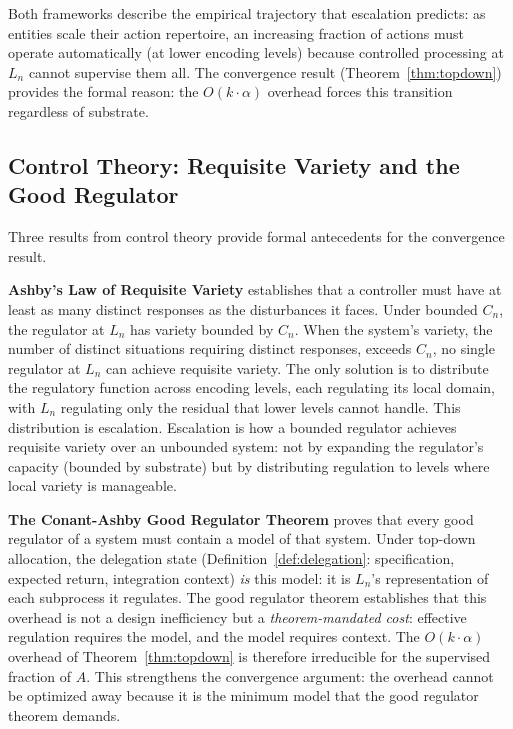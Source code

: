 \documentclass[11pt]{article}
\theoremstyle{definition}
\begin{document}
Both frameworks describe the empirical trajectory that escalation
predicts: as entities scale their action repertoire, an increasing
fraction of actions must operate automatically (at lower encoding
levels) because controlled processing at $L_n$ cannot supervise
them all. The convergence result (Theorem~\ref{thm:topdown}) provides
the formal reason: the $O(k \cdot \alpha)$ overhead forces this
transition regardless of substrate.

\subsection{Control Theory: Requisite Variety and the Good Regulator}

Three results from control theory provide formal antecedents for the
convergence result.

\textbf{Ashby's Law of Requisite Variety} \cite{Ashby1956} establishes
that a controller must have at least as many distinct responses as the
disturbances it faces. Under bounded $C_n$, the regulator at $L_n$ has
variety bounded by $C_n$. When the system's variety, the number of
distinct situations requiring distinct responses, exceeds $C_n$, no
single regulator at $L_n$ can achieve requisite variety. The only
solution is to distribute the regulatory function across encoding
levels, each regulating its local domain, with $L_n$ regulating only
the residual that lower levels cannot handle. This distribution is
escalation. Escalation is how a bounded regulator achieves requisite
variety over an unbounded system: not by expanding the regulator's
capacity (bounded by substrate) but by distributing regulation to
levels where local variety is manageable.

\textbf{The Conant-Ashby Good Regulator Theorem} \cite{ConantAshby1970}
proves that every good regulator of a system must contain a model of
that system. Under top-down allocation, the delegation state
(Definition~\ref{def:delegation}: specification, expected return,
integration context) \emph{is} this model: it is $L_n$'s
representation of each subprocess it regulates. The good regulator
theorem establishes that this overhead is not a design inefficiency but
a \emph{theorem-mandated cost}: effective regulation requires the model,
and the model requires context. The $O(k \cdot \alpha)$ overhead of
Theorem~\ref{thm:topdown} is therefore irreducible for the supervised
fraction of $A$. This strengthens the convergence argument: the
overhead cannot be optimized away because it is the minimum model
that the good regulator theorem demands.
\end{document}
